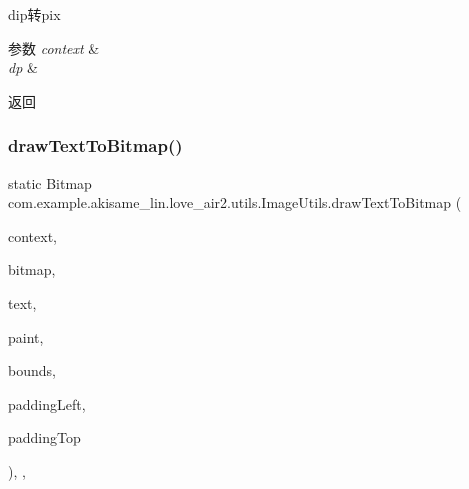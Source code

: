 dip转pix


\begin{DoxyParams}{参数}
{\em context} & \\
\hline
{\em dp} & \\
\hline
\end{DoxyParams}
\begin{DoxyReturn}{返回}

\end{DoxyReturn}
\mbox{\label{classcom_1_1example_1_1akisame__lin_1_1love__air2_1_1utils_1_1_image_utils_ae63dec81aa6843faaf416a6d0118a345}} 
\subsubsection{\texorpdfstring{drawTextToBitmap()}{drawTextToBitmap()}}
{\footnotesize\ttfamily static Bitmap com.\+example.\+akisame\+\_\+lin.\+love\+\_\+air2.\+utils.\+Image\+Utils.\+draw\+Text\+To\+Bitmap (\begin{DoxyParamCaption}\item[{Context}]{context,  }\item[{Bitmap}]{bitmap,  }\item[{String}]{text,  }\item[{Paint}]{paint,  }\item[{Rect}]{bounds,  }\item[{int}]{padding\+Left,  }\item[{int}]{padding\+Top }\end{DoxyParamCaption})\hspace{0.3cm}{\ttfamily [inline]}, {\ttfamily [static]}, {\ttfamily [private]}}


